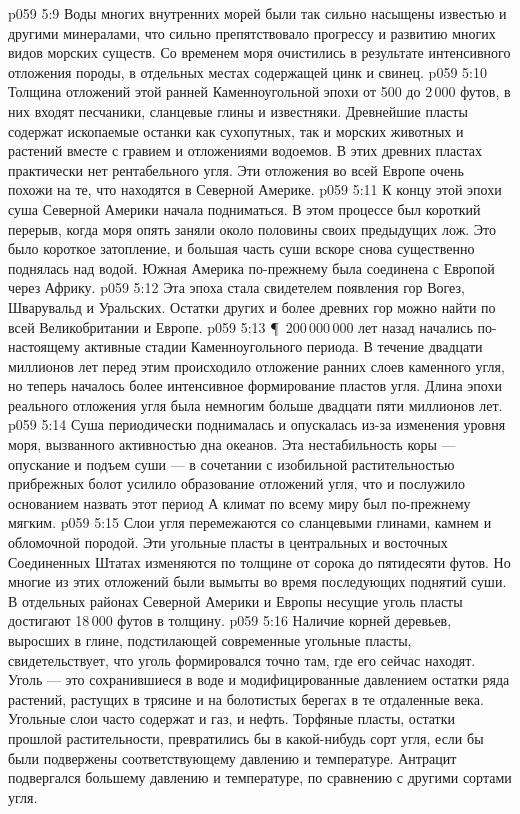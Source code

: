 \vs p059 5:9 Воды многих внутренних морей были так сильно насыщены известью и другими минералами, что сильно препятствовало прогрессу и развитию многих видов морских существ. Со временем моря очистились в результате интенсивного отложения породы, в отдельных местах содержащей цинк и свинец.
\vs p059 5:10 Толщина отложений этой ранней Каменноугольной эпохи от 500 до 2\,000 футов, в них входят песчаники, сланцевые глины и известняки. Древнейшие пласты содержат ископаемые останки как сухопутных, так и морских животных и растений вместе с гравием и отложениями водоемов. В этих древних пластах практически нет рентабельного угля. Эти отложения во всей Европе очень похожи на те, что находятся в Северной Америке.
\vs p059 5:11 К концу этой эпохи суша Северной Америки начала подниматься. В этом процессе был короткий перерыв, когда моря опять заняли около половины своих предыдущих лож. Это было короткое затопление, и большая часть суши вскоре снова существенно поднялась над водой. Южная Америка по\hyp{}прежнему была соединена с Европой через Африку.
\vs p059 5:12 Эта эпоха стала свидетелем появления гор Вогез, Шварувальд и Уральских. Остатки других и более древних гор можно найти по всей Великобритании и Европе.
\vs p059 5:13 \P\ 200\,000\,000 лет назад начались по\hyp{}настоящему активные стадии Каменноугольного периода. В течение двадцати миллионов лет перед этим происходило отложение ранних слоев каменного угля, но теперь началось более интенсивное формирование пластов угля. Длина эпохи реального отложения угля была немногим больше двадцати пяти миллионов лет.
\vs p059 5:14 Суша периодически поднималась и опускалась из\hyp{}за изменения уровня моря, вызванного активностью дна океанов. Эта нестабильность коры --- опускание и подъем суши --- в сочетании с изобильной растительностью прибрежных болот усилило образование отложений угля, что и послужило основанием назвать этот период  А климат по всему миру был по\hyp{}прежнему мягким.
\vs p059 5:15 Слои угля перемежаются со сланцевыми глинами, камнем и обломочной породой. Эти угольные пласты в центральных и восточных Соединенных Штатах изменяются по толщине от сорока до пятидесяти футов. Но многие из этих отложений были вымыты во время последующих поднятий суши. В отдельных районах Северной Америки и Европы несущие уголь пласты достигают 18\,000 футов в толщину.
\vs p059 5:16 Наличие корней деревьев, выросших в глине, подстилающей современные угольные пласты, свидетельствует, что уголь формировался точно там, где его сейчас находят. Уголь --- это сохранившиеся в воде и модифицированные давлением остатки ряда растений, растущих в трясине и на болотистых берегах в те отдаленные века. Угольные слои часто содержат и газ, и нефть. Торфяные пласты, остатки прошлой растительности, превратились бы в какой\hyp{}нибудь сорт угля, если бы были подвержены соответствующему давлению и температуре. Антрацит подвергался большему давлению и температуре, по сравнению с другими сортами угля.
